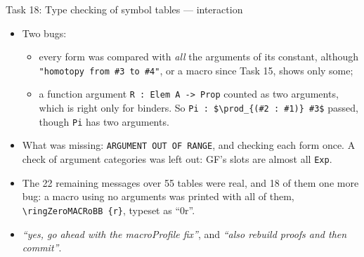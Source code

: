 \documentclass[10pt,aspectratio=169]{beamer}
\newcommand{\bad}[1]{\textcolor{warn}{#1}}
\begin{document}
\begin{frame}{Task 18: Type checking of symbol tables --- interaction}
  \begin{itemize}\small
    \item Two bugs:
      \begin{itemize}\footnotesize
        \item every form was compared with \emph{all} the arguments of its constant,
              although \texttt{"homotopy from \#3 to \#4"}, or a macro since Task 15,
              shows only some;
        \item a function argument \texttt{R : Elem A -> Prop} counted as two arguments,
              which is right only for binders. So
              \texttt{Pi : \$\textbackslash prod\_\{(\#2 : \#1)\} \#3\$} \bad{passed},
              though \texttt{Pi} has two arguments.
      \end{itemize}
    \item What was missing: \texttt{ARGUMENT OUT OF RANGE}, and checking each form once.
          A check of argument categories was left out: GF's slots are almost all \texttt{Exp}.
    \item The 22 remaining messages over 55 tables were real, and 18 of them one more bug:
          a macro using no arguments was printed with all of them,
          \bad{\texttt{\textbackslash ringZeroMACRoBB \{r\}}}, typeset as ``0r''.
    \item \emph{``yes, go ahead with the macroProfile fix''}, and
          \emph{``also rebuild proofs and then commit''}.
  \end{itemize}
\end{frame}
\end{document}
